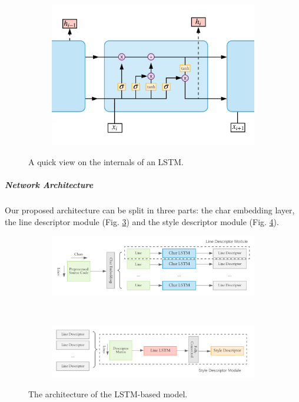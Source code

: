 \begin{figure}[ht]
	\begin{subfigure}[t]{0.60\textwidth}
		\includegraphics[width=\linewidth]{imgs/lstm_cell.pdf}
		\label{fig:rnn:lstm}
	\end{subfigure}%
	\caption{A quick view on the internals of an LSTM.}
	\label{fig:rnn}
\end{figure}

\subparagraph*{Network Architecture}

Our proposed architecture can be split in three parts: the char embedding layer, the line descriptor module (Fig. \ref{fig:lstm_architecture:a}) and the style descriptor module (Fig. \ref{fig:lstm_architecture:b}).

\begin{figure}[htbp]
	\centering
	\begin{subfigure}[t]{\textwidth}
		\includegraphics[width=\linewidth]{imgs/lstm_char_level.pdf}
		\label{fig:lstm_architecture:a}
	\end{subfigure}%
	\\
	\begin{subfigure}[t]{\textwidth}
		\includegraphics[width=\linewidth]{imgs/lstm_line_level.pdf}
		\label{fig:lstm_architecture:b}
	\end{subfigure}%
	\caption{The architecture of the LSTM-based model.}
	\label{fig:lstm_architecture}
\end{figure}

